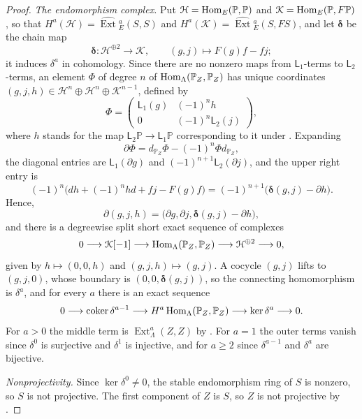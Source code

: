 \begin{proof}
  \emph{The endomorphism complex.} Put ${\mathcal{H}=\Hom[E]{\mathbb{P}}
  {\mathbb{P}}}$ and ${\mathcal{K}=\Hom[E]{\mathbb{P}}{F\mathbb{P}}}$, so that
  ${H^a(\mathcal{H})=\widehat{\operatorname{Ext}}{}^a_E(S,S)}$ and
  ${H^a(\mathcal{K})=\widehat{\operatorname{Ext}}{}^a_E(S,FS)}$, and let
  $\boldsymbol{\delta}$ be the chain map
  \[
    \boldsymbol{\delta}\colon\mathcal{H}^{\oplus2}\longrightarrow\mathcal{K},
    \qquad(g,j)\longmapsto F(g)f-fj;
  \]
  it induces $\delta^a$ in cohomology. Since there
  are no nonzero maps from $\mathsf{L}_1$-terms to $\mathsf{L}_2$-terms, an
  element $\Phi$ of degree $n$ of $\Hom[\Lambda]{\mathbb{P}_Z}{\mathbb{P}_Z}$
  has unique coordinates ${(g,j,h)\in\mathcal{H}^n\oplus\mathcal{H}^n\oplus
  \mathcal{K}^{n-1}}$, defined by
  \[
    \Phi=\begin{pmatrix}\mathsf{L}_1(g)&(-1)^nh\\0&(-1)^n\mathsf{L}_2(j)
    \end{pmatrix},
  \]
  where $h$ stands for the map ${\mathsf{L}_2\mathbb{P}\to\mathsf{L}_1
  \mathbb{P}}$ corresponding to it under . Expanding
  \[
    \partial\Phi=d_{\mathbb{P}_Z}\Phi-(-1)^n\Phi d_{\mathbb{P}_Z},
  \]
  the diagonal
  entries are $\mathsf{L}_1(\partial g)$ and ${(-1)^{n+1}\mathsf{L}_2(\partial
  j)}$, and the upper right entry is
  \[
    (-1)^n\bigl(dh+(-1)^nhd+fj-F(g)f\bigr)
    =(-1)^{n+1}\bigl(\boldsymbol{\delta}(g,j)-\partial h\bigr).
  \]
  Hence,
  \[
    \partial(g,j,h)=\bigl(\partial g,\partial j,\boldsymbol{\delta}(g,j)-
    \partial h\bigr),
  \]
  and there is a degreewise split short exact sequence of complexes
  \[
    0\longrightarrow\mathcal{K}[-1]\longrightarrow
    \Hom[\Lambda]{\mathbb{P}_Z}{\mathbb{P}_Z}\longrightarrow
    \mathcal{H}^{\oplus2}\longrightarrow0,
  \]
  given by ${h\mapsto(0,0,h)}$ and ${(g,j,h)\mapsto(g,j)}$. A cocycle $(g,j)$
  lifts to $(g,j,0)$, whose boundary is $(0,0,\boldsymbol{\delta}(g,j))$, so
  the connecting homomorphism is $\delta^a$, and for every $a$ there is an exact
  sequence
  \begin{equation}
    \label{eq:conversion-sequence}
    0\longrightarrow\operatorname{coker}\delta^{a-1}\longrightarrow
    H^a\Hom[\Lambda]{\mathbb{P}_Z}{\mathbb{P}_Z}\longrightarrow
    \ker\delta^a\longrightarrow0.
  \end{equation}
  For ${a>0}$ the middle term is $\operatorname{Ext}^a_\Lambda(Z,Z)$ by
  . For ${a=1}$ the outer terms vanish since
  $\delta^0$ is surjective and $\delta^1$ is injective, and for ${a\geq2}$ since
  $\delta^{a-1}$ and $\delta^a$ are bijective.

  \emph{Nonprojectivity.} Since ${\ker\delta^0\neq0}$, the stable endomorphism
  ring of $S$ is nonzero, so $S$ is not projective. The first component of $Z$
  is $S$, so $Z$ is not projective by .
\end{proof}

